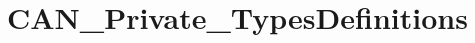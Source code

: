 \hypertarget{group___c_a_n___private___types_definitions}{}\section{C\+A\+N\+\_\+\+Private\+\_\+\+Types\+Definitions}
\label{group___c_a_n___private___types_definitions}
